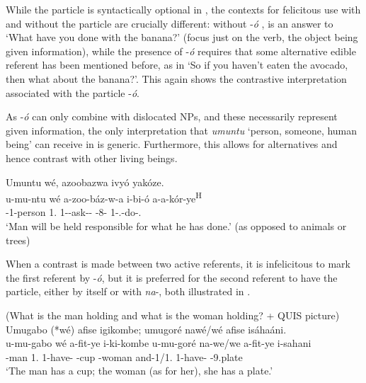 \documentclass[output=paper]{langscibook}
\begin{document}
\z

While the particle is syntactically optional in , the contexts for felicitous use with and without the particle are crucially different: without -\textit{ó} ,  is an answer to ‘What have you done with the banana?’ (focus just on the verb, the object being given information), while the presence of -\textit{ó} requires that some alternative edible referent has been mentioned before, as in ‘So if you haven’t eaten the avocado, then what about the banana?’. This again shows the contrastive interpretation associated with the particle -\textit{ó}.

As -\textit{ó} can only combine with dislocated NPs, and these necessarily represent given information, the only interpretation that \textit{umuntu} ‘person, someone, human being’ can receive in  is generic. Furthermore, this allows for alternatives and hence contrast with other living beings.

\ea
\label{bkm:Ref75182159}
Umuntu wé, azoobazwa ivyó yakóze.\\
\gll
u-mu-ntu  wé  a-zoo-báz-w-a  i-bi-ó  a-a-kór-ye\textsuperscript{H}\\
\AUG{}-1-person  1.\CM{}  1\SM{}-\FUT{}-ask-\PASS{}-\FV{}  \AUG{}-8-\PRO{}  1\SM{}-\N.\PST{}-do-\PFV{}.\REL{}\\
\glt
‘Man will be held responsible for what he has done.’ (as opposed to animals or trees)\\

\z

When a contrast is made between two active referents, it is infelicitous to mark the first referent by -\textit{ó}, but it is preferred for the second referent to have the particle, either by itself or with \textit{na}-, both illustrated in .

\ea
\label{bkm:Ref81509490}
(What is the man holding and what is the woman holding? + QUIS picture)\\
Umugabo (*wé) afise igikombe; umugoré nawé/wé afise isáhaáni.\\
\gll
u-mu-gabo  wé  a-fit-ye  i-ki-kombe  u-mu-goré  na-we/we   a-fit-ye  i-sahani \\
-man  1.\CM{}  1\SM{}-have-\PFV{}  -{}cup  -woman  and-1\PRO/1.\CM{}   1\SM-have-\PFV{}  \AUG{}-9.plate \\
\glt
  ‘The man has a cup; the woman (as for her), she has a plate.’\\
\end{document}
